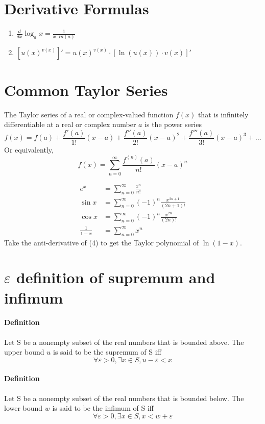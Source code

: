 \documentclass[11pt]{article}
\begin{document}
\section{Derivative Formulas}
\begin{enumerate}
	\item $\frac{d}{dx}\log_a{x} = \frac{1}{x \cdot ln(a)}$
	\item $[u(x)^{v(x)}]' = u(x)^{v(x)} \cdot [\ln(u(x))\cdot v(x)]'$
\end{enumerate}

\section{Common Taylor Series}
The Taylor series of a real or complex-valued function $f(x)$ that is infinitely differentiable at a real or complex number $a$ is the power series
$$f(x) = f(a) + \frac{f'(a)}{1!}(x - a) + \frac{f''(a)}{2!}(x-a)^2 + \frac{f'''(a)}{3!}(x-a)^3 + \hdots$$
Or equivalently,
$$f(x) = \sum_{n=0}^\infty \frac{f^{(n)}(a)}{n!}(x - a)^n$$

\axiom
\begin{align}
	e^x &= \sum_{n=0}^{\infty}\frac{x^n}{n!}\\
	\sin{x} &= \sum_{n=0}^{\infty}(-1)^n\frac{x^{2n+1}}{(2n+1)!}\\
	\cos{x} &= \sum_{n=0}^{\infty}(-1)^n\frac{x^{2n}}{(2n)!}\\
	\frac{1}{1-x} &= \sum_{n=0}^{\infty}x^n
\end{align}
\remark
Take the anti-derivative of (4) to get the Taylor polynomial of $\ln(1-x)$.
\section{$\varepsilon$ definition of supremum and infimum}
\paragraph{Definition} Let S be a nonempty subset of the real numbers that is bounded above. The upper bound $u$ is said to be the supremum of S iff $$\forall \varepsilon >0, \exists x \in S, u - \varepsilon < x$$
\paragraph{Definition} Let S be a nonempty subset of the real numbers that is bounded below. The lower bound $w$ is said to be the infimum of S iff $$\forall \varepsilon >0, \exists x \in S, x < w + \varepsilon$$
\end{document}

